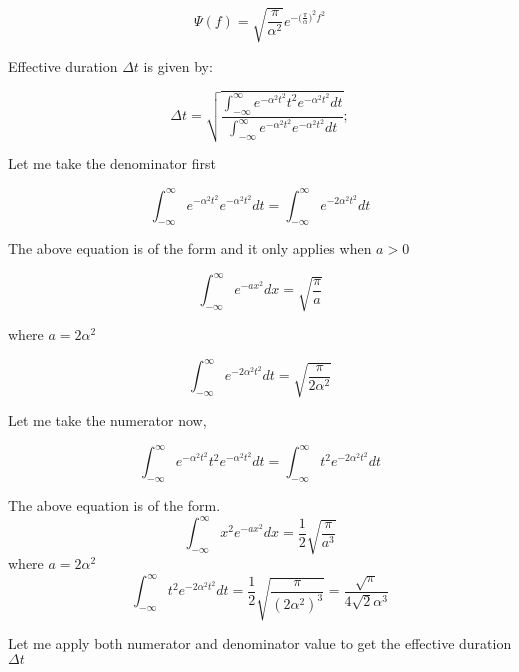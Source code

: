 \documentclass[paper=a4, fontsize=11pt,twoside]{scrartcl}		%
\begin{document}
\begin{equation*}
\Psi(f) = \sqrt{\frac{\pi}{\alpha ^2}} e^{-{(\frac{\pi} {\alpha}})^2 f^2}
\end{equation*}

Effective duration $\Delta t$ is given by:

\begin{equation*}
\Delta t = \sqrt{\frac{\int_{-\infty}^{\infty}{e^{-\alpha ^2 t^2} t^2  e^{-\alpha ^2 t^2} dt}}{\int_{-\infty}^{\infty}{e^{-\alpha ^2 t^2} e^{-\alpha ^2 t^2}dt}}} ;
\end{equation*}

Let me take the denominator first

\begin{equation*}
\int_{-\infty}^{\infty}{e^{-\alpha ^2 t^2} e^{-\alpha ^2 t^2}dt} =\int_{-\infty}^{\infty}{e^{-2\alpha ^2 t^2} dt}
\end{equation*}

The above equation is of the form and it only applies when $a > 0$

\begin{equation*}
\int_{-\infty}^{\infty}e^{-ax^2 }dx = \sqrt{\frac{\pi}{a}}
\end{equation*}

where $a = 2\alpha ^ 2$

\begin{equation*}
\int_{-\infty}^{\infty}{e^{-2\alpha ^2 t^2} dt} = \sqrt{\frac{\pi}{2\alpha ^ 2}}
\end{equation*}

Let me take the numerator now,

\begin{equation*}
\int_{-\infty}^{\infty}{e^{-\alpha ^2 t^2} t^2 e^{-\alpha ^2 t^2}dt} =\int_{-\infty}^{\infty}{t^2 e^{-2\alpha ^2 t^2} dt}
\end{equation*}

The above equation is of the form.
\begin{equation*}
\int_{-\infty}^{\infty}x^2 e^{- ax^2 }dx = \frac{1}{2}\sqrt{\frac{\pi}{a^3}}
\end{equation*}
where $a = 2\alpha ^ 2$
\begin{equation*}
\int_{-\infty}^{\infty}{t^2 e^{-2\alpha ^2 t^2} dt} = \frac{1}{2} \sqrt{\frac{\pi}{({2\alpha ^2})^3}} = \frac{\sqrt{\pi}}{4 \sqrt{2}\alpha ^3}
\end{equation*}

Let me apply both numerator and denominator value to get the effective duration $\Delta t$
\end{document}

